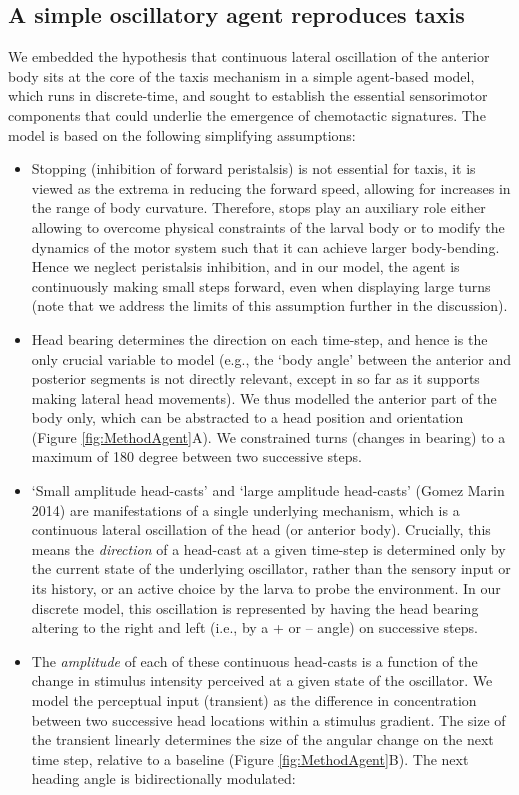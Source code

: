 \documentclass[11pt,a4paper]{article}
\begin{document}
\subsection{A simple oscillatory agent reproduces taxis}
We embedded the hypothesis that continuous lateral oscillation of the anterior body sits at the core of the taxis mechanism in a simple agent-based model, which runs in discrete-time, and sought to establish the essential sensorimotor components that could underlie the emergence of chemotactic signatures. The model is based on the following simplifying assumptions:
\begin{itemize}
\item Stopping (inhibition of forward peristalsis) is not essential for taxis, it is viewed as the extrema in reducing the forward speed, allowing for increases in the range of body curvature. Therefore, stops play an auxiliary role either allowing to overcome physical constraints of the larval body or to modify the dynamics of the motor  system such that it can achieve larger body-bending. Hence we neglect peristalsis inhibition, and in our model, the agent is continuously making small steps forward, even when displaying large turns (note that we address the limits of this assumption further in the discussion).
\item Head bearing determines the direction on each time-step, and hence is the only crucial variable to model (e.g., the ‘body angle’ between the anterior and posterior segments is not directly relevant, except in so far as it supports making lateral head movements). We thus modelled the anterior part of the body only, which can be abstracted to a head position and orientation (Figure \ref{fig:MethodAgent}A). We constrained turns (changes in bearing) to a maximum of 180 degree between two successive steps.
\item ‘Small amplitude head-casts’ and ‘large amplitude head-casts’ (Gomez Marin 2014) are manifestations of a single underlying mechanism, which is a continuous lateral oscillation of the head (or anterior body). Crucially, this means the {\it direction} of a head-cast at a given time-step is determined only by the current state of the underlying oscillator, rather than the sensory input or its history, or an active choice by the larva to probe the environment. In our discrete model, this oscillation is represented by having the head bearing altering to the right and left (i.e., by a + or – angle) on successive steps. 
\item The {\it amplitude} of each of these continuous head-casts is a function of the change in stimulus intensity perceived at a given state of the oscillator. We model the perceptual input (transient) as the difference in concentration between two successive head locations within a stimulus gradient. The size of the transient linearly determines the size of the angular change on the next time step, relative to a baseline (Figure \ref{fig:MethodAgent}B). The next heading angle is bidirectionally modulated:

\end{itemize}
\end{document}

